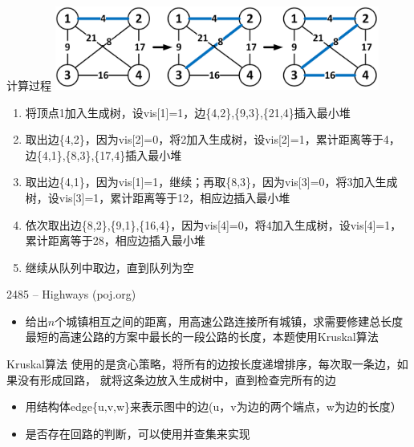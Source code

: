 \begin{frame}{计算过程}
    \includegraphics[width=0.8\textwidth,center]{fig/8-1.png}
\begin{enumerate}[(1)]
    \item 将顶点1加入生成树，设vis[1]=1，边\{4,2\},\{9,3\},\{21,4\}插入最小堆\pause
    \item 取出边\{4,2\}，因为vis[2]=0，将2加入生成树，设vis[2]=1，累计距离等于4，边\{4,1\},\{8,3\},\{17,4\}插入最小堆\pause
    \item 取出边\{4,1\}，因为vis[1]=1，继续；再取\{8,3\}，因为vis[3]=0，将3加入生成树，设vis[3]=1，累计距离等于12，相应边插入最小堆\pause
    \item 依次取出边\{8,2\},\{9,1\},\{16,4\}，因为vis[4]=0，将4加入生成树，设vis[4]=1，累计距离等于28，相应边插入最小堆\pause
    \item 继续从队列中取边，直到队列为空
\end{enumerate}
\end{frame}
\begin{frame}{2485 -- Highways (poj.org)}
    \begin{itemize}
        \item 给出$n$个城镇相互之间的距离，用高速公路连接所有城镇，求需要修建总长度最短的高速公路的方案中最长的一段公路的长度，本题使用Kruskal算法
    \end{itemize}    
    \begin{block}{Kruskal算法}
        使用的是贪心策略，将所有的边按长度递增排序，每次取一条边，如果没有形成回路， 就将这条边放入生成树中，直到检查完所有的边
    \end{block}
    \begin{itemize}
        \item 用结构体edge\{u,v,w\}来表示图中的边(u，v为边的两个端点，w为边的长度）
        \item 是否存在回路的判断，可以使用并查集来实现
    \end{itemize}
\end{frame}    
